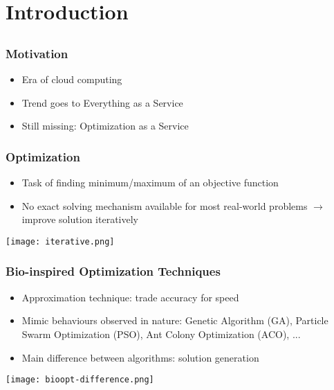 \section{Introduction}
\subsection{}
\begin{frame}
  \frametitle{Motivation}
  \begin{itemize}
    \item Era of cloud computing
    \item Trend goes to Everything as a Service
    \item Still missing: Optimization as a Service
  \end{itemize}
\end{frame}

\begin{frame}
  \frametitle{Optimization}
  \begin{itemize}
    \item Task of finding minimum/maximum of an objective function
    \item No exact solving mechanism available for most real-world problems $\rightarrow$ improve solution iteratively
  \end{itemize}
  \vspace{.5em}
  \begin{center}
    \texttt{[image: iterative.png]}
  \end{center}
\end{frame}

\begin{frame}
  \frametitle{Bio-inspired Optimization Techniques}
  \begin{itemize}
    \item Approximation technique: trade accuracy for speed
    \item Mimic behaviours observed in nature: Genetic Algorithm (GA), Particle Swarm Optimization (PSO), Ant Colony Optimization (ACO), ...
    \item Main difference between algorithms: solution generation
  \end{itemize}
  \begin{center}
    \texttt{[image: bioopt-difference.png]}
  \end{center}
\end{frame}

